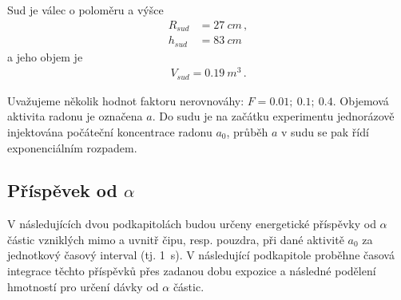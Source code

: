 \documentclass[11pt,a4paper]{article}
\begin{document}
Sud je válec o poloměru a výšce
\begin{align}
R_{sud}&=\SI{27}{cm}\,,\\
h_{sud}&=\SI{83}{cm}\,
\end{align}
a jeho objem je
\begin{align}
	V_{sud}=\SI{0,19}{m^3}\,.
\end{align}

Uvažujeme několik hodnot faktoru nerovnováhy: $F=\num{0,01};\ \num{0,1};\ \num{0,4}$. Objemová aktivita radonu je označena $a$. Do sudu je na začátku experimentu jednorázově injektována počáteční koncentrace radonu $a_0$, průběh $a$ v sudu se pak řídí exponenciálním rozpadem.
\subsection{Příspěvek od $\alpha$}
V následujících dvou podkapitolách budou určeny energetické příspěvky od $\alpha$ částic vzniklých mimo a uvnitř čipu, resp. pouzdra, při dané aktivitě $a_0$ za jednotkový časový interval (tj. \SI{1}{s}). V následující podkapitole proběhne časová integrace těchto příspěvků přes zadanou dobu expozice a následné podělení hmotností pro určení dávky od $\alpha$ částic.
\end{document}
